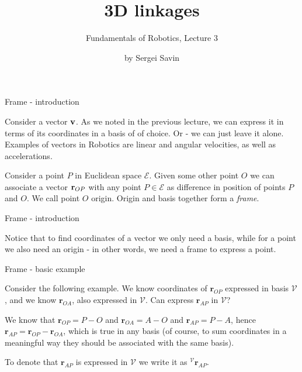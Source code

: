 \documentclass{beamer}
\title{3D linkages}
\subtitle{Fundamentals of Robotics, Lecture 3}
\author{by Sergei Savin}
\date{\mydate}
\begin{document}
\maketitle




\begin{frame}{Frame - introduction}
	\begin{flushleft}
		
		Consider a vector $\mathbf{v}$. As we noted in the previous lecture, we can express it in terms of its coordinates in a basis of of choice. Or - we can just leave it alone. Examples of vectors in Robotics are linear and angular velocities, as well as accelerations.
		
		\bigskip
		
		Consider a point $P$ in Euclidean space $\mathcal E$. Given some other point $O$ we can associate a vector $\mathbf{r}_{OP}$ with any point $P \in \mathcal E$ as difference in position of points $P$ and $O$. We call point $O$ origin. Origin and basis together form a \emph{frame}.
		
	\end{flushleft}
\end{frame}

\begin{frame}{Frame - introduction}
	\begin{flushleft}
		
		Notice that to find coordinates of a vector we only need a basis, while for a point we also need an origin - in other words, we need a frame to express a point.
		
	\end{flushleft}
\end{frame}


\begin{frame}{Frame - basic example}
	\begin{flushleft}
		
		Consider the following example. We know coordinates of $\mathbf r_{OP} $ expressed in basis $\mathcal V$, and we know $\mathbf r_{OA}$, also expressed in $\mathcal V$. Can express  $\mathbf r_{AP}$ in $\mathcal V$?
		
		\bigskip
		
		We know that $\mathbf r_{OP} = P - O$ and $\mathbf r_{OA} = A - O$ and $\mathbf r_{AP} = P - A$, hence $\mathbf r_{AP} = \mathbf r_{OP} - \mathbf r_{OA}$, which is true in any basis (of course, to sum coordinates in a meaningful way they should be associated with the same basis).
		
		\bigskip
		
		To denote that $\mathbf r_{AP}$ is expressed in $\mathcal V$ we write it as $^{\mathcal V} \mathbf r_{AP}$.
		
	\end{flushleft}
\end{frame}
\end{document}

